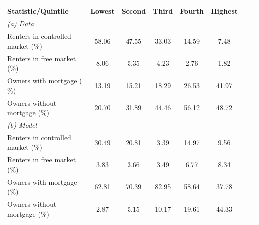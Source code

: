 \begin{table}[p]
\footnotesize
\renewcommand{\arraystretch}{1.2}
\begin{center}
\begin{tabular}{lccccccc}
\toprule
Statistic/Quintile & Lowest & Second & Third & Fourth & Highest\\ 
\midrule
\multicolumn{6}{l}{\textit{(a) Data}}\\
Renters in controlled market (\%) & 58.06 & 47.55 & 33.03 & 14.59 & 7.48\\
Renters in free market (\%) & 8.06 & 5.35 & 4.23 & 2.76 & 1.82 \\
Owners with mortgage ($\%$) & 13.19 & 15.21 & 18.29 & 26.53 & 41.97\\
Owners without mortgage ($\%$) & 20.70 & 31.89 & 44.46 & 56.12 & 48.72 \\
\multicolumn{6}{l}{\textit{(b) Model}}\\
Renters in controlled market (\%) & 30.49 & 20.81 & 3.39 & 14.97 & 9.56\\
Renters in free market (\%) & 3.83 & 3.66 & 3.49 & 6.77 & 8.34 \\
Owners with mortgage (\%) & 62.81 & 70.39 & 82.95 & 58.64 & 37.78 \\
Owners without mortgage (\%) & 2.87 & 5.15 & 10.17 & 19.61 & 44.33 \\
\bottomrule
\end{tabular}
\end{center}
\normalsize
\end{table}
